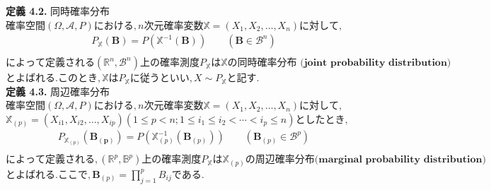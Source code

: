 \documentclass[dvipdfmx,10pt, a4j]{jarticle}
\theoremstyle{definition}
\begin{document}
\noindent
\textbf{定義 4.2.} 同時確率分布\\
$確率空間(\Omega, \mathscr{A}, P)における, n次元確率変数　\mathbb{X} = (X_1, X_2, \dots, X_n)　に対して,$\\
\begin{align*}
    P_{\mathbb{X}}(\mathbf{B}) = P(\mathbb{X}^{-1}(\mathbf{B})) \qquad (\mathbf{B} \in \mathscr{B}^{n}) \\
\end{align*}
$によって定義される(\mathbb{R}^{n}, \mathscr{B}^{n})上の確率測度P_{\mathbb{X}}は \mathbb{X} の \textbf{同時確率分布 (joint probability distribution)}$
$とよばれる. このとき, \mathbb{X} は P_{\mathbb{X}}に従うといい, X \sim P_{\mathbb{X}} と記す.$\\

\noindent
\textbf{定義 4.3.} 周辺確率分布\\
$確率空間 (\Omega, \mathscr{A}, P)における, n次元確率変数 \mathbb{X} = (X_1, X_2, \dots, X_n) に対して,$
$\mathbb{X}_{(p)} = (X_{i1}, X_{i2}, \dots , X_{ip}) (1 \leq p < n; 1 \leq i_1 \leq i_2 < \cdots < i_p \leq n)としたとき,$\\
\begin{align*}
    P_{\mathbb{X}_{(p)}}(\mathbf{B_{(p)}}) = P \left(\mathbb{X}_{(p)}^{-1}(\mathbf{B}_{(p)}) \right) \qquad (\mathbf{B}_{(p)} \in \mathscr{B}^{p})\\
\end{align*}
$によって定義される, (\mathbb{R}^{p}, \mathbb{B}^{p}) 上の確率測度 P_{\mathbb{X}} は \mathbb{X}_{(p)} の \textbf{周辺確率分布(marginal probability distribution)}$
$とよばれる. ここで, \mathbf{B}_{(p)} = \prod_{j=1}^{p}{B_{ij}}である.$\\
\end{document}
